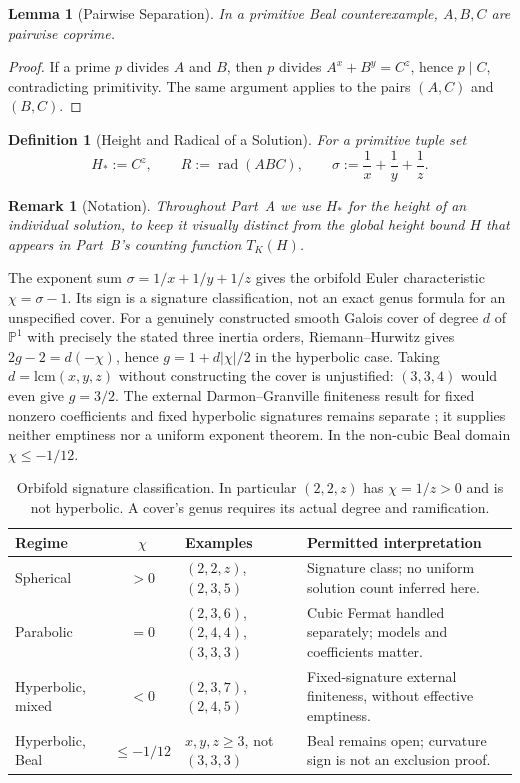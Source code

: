 \documentclass[11pt,a4paper]{article}
\DeclareMathOperator{\rad}{rad}
\newtheorem{lemma}[theorem]{Lemma}
\newtheorem{definition}[theorem]{Definition}
\newtheorem{remark}[theorem]{Remark}
\begin{document}
\begin{lemma}[Pairwise Separation]
\label{lem:pairwise}
In a primitive Beal counterexample, $A,B,C$ are pairwise coprime.
\end{lemma}

\begin{proof}
If a prime $p$ divides $A$ and $B$, then $p$ divides $A^x+B^y=C^z$,
hence $p \mid C$, contradicting primitivity. The same argument applies
to the pairs $(A,C)$ and $(B,C)$.
\end{proof}

\begin{definition}[Height and Radical of a Solution]
For a primitive tuple set
\[
  H_* := C^z, \qquad R := \rad(ABC), \qquad
  \sigma := \frac1x+\frac1y+\frac1z.
\]
\end{definition}

\begin{remark}[Notation]
Throughout Part~A we use $H_*$ for the height of an individual
solution, to keep it visually distinct from the global height bound
$H$ that appears in Part~B's counting function $T_K(H)$.
\end{remark}

The exponent sum $\sigma=1/x+1/y+1/z$ gives the orbifold
Euler characteristic $\chi=\sigma-1$. Its sign is a signature
classification, not an exact genus formula for an unspecified cover.
For a genuinely constructed smooth Galois cover of degree $d$ of
$\mathbb P^1$ with precisely the stated three inertia orders,
Riemann--Hurwitz gives $2g-2=d(-\chi)$, hence
$g=1+d|\chi|/2$ in the hyperbolic case. Taking
$d=\mathrm{lcm}(x,y,z)$ without constructing the cover is unjustified:
$(3,3,4)$ would even give $g=3/2$.
The external Darmon--Granville finiteness result for fixed nonzero
coefficients and fixed hyperbolic signatures remains separate
\cite{DarmonGranville1995}; it supplies neither emptiness nor a uniform
exponent theorem. In the non-cubic Beal domain $\chi\le-1/12$.
\begin{table}[!htbp]
\centering\small
\begin{tabularx}{\textwidth}{@{}l c >{\raggedright\arraybackslash}p{3.1cm} >{\raggedright\arraybackslash}X@{}}
\toprule
Regime & $\chi$ & Examples & Permitted interpretation\\
\midrule
Spherical & $>0$ & $(2,2,z)$, $(2,3,5)$ & Signature class; no uniform solution count inferred here.\\
\addlinespace
Parabolic & $=0$ & $(2,3,6)$, $(2,4,4)$, $(3,3,3)$ & Cubic Fermat handled separately; models and coefficients matter.\\
\addlinespace
Hyperbolic, mixed & $<0$ & $(2,3,7)$, $(2,4,5)$ & Fixed-signature external finiteness, without effective emptiness.\\
\addlinespace
Hyperbolic, Beal & $\le-1/12$ & $x,y,z\ge3$, not $(3,3,3)$ & Beal remains open; curvature sign is not an exclusion proof.\\
\bottomrule
\end{tabularx}
\caption{Orbifold signature classification. In particular $(2,2,z)$ has $\chi=1/z>0$ and is not hyperbolic. A cover's genus requires its actual degree and ramification.}
\label{tab:regime_matrix}
\end{table}
\end{document}
